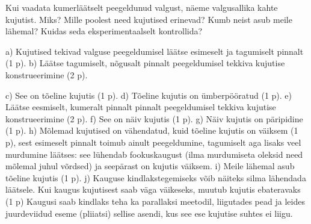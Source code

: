 
Kui vaadata kumerläätselt peegeldunud valgust, näeme valgusallika kahte kujutist. Miks? Mille poolest need kujutised erinevad? Kumb neist asub meile lähemal? Kuidas seda eksperimentaalselt kontrollida?

\hint

\solu
a) Kujutised tekivad valguse peegeldumisel läätse esimeselt ja tagumiselt pinnalt (1 p). b) Läätse tagumiselt, nõgusalt pinnalt peegeldumisel tekkiva kujutise konstrueerimine (2 p).

c) See on tõeline kujutis (1 p). d) Tõeline kujutis on ümberpööratud (1 p). e) Läätse eesmiselt, kumeralt pinnalt pinnalt peegeldumisel tekkiva kujutise konstrueerimine (2 p). f) See on näiv kujutis (1 p). g) Näiv kujutis on päripidine (1 p). h) Mõlemad kujutised on vähendatud, kuid tõeline kujutis on väiksem (1 p), sest esimeselt pinnalt toimub ainult peegeldumine, tagumiselt aga lisaks veel murdumine läätses: see lühendab fookuskaugust (ilma murdumiseta oleksid need mõlemal juhul võrdsed) ja seepärast on kujutis väiksem. i) Meile lähemal asub tõeline kujutis (1 p). j) Kauguse kindlakstegemiseks võib näiteks silma lähendada läätsele. Kui kaugus kujutisest saab väga väikeseks, muutub kujutis ebateravaks (1 p) Kaugusi saab kindlaks teha ka parallaksi meetodil, liigutades pead ja leides juurdeviidud eseme (pliiatsi) sellise asendi, kus see ese kujutise suhtes ei liigu.
\probend
